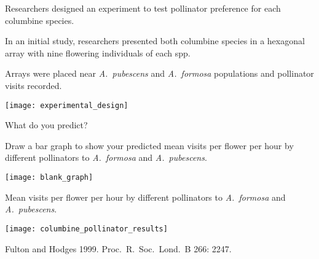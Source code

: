 \documentclass[t,hidelinks]{beamer}
\begin{document}
%
\begin{frame}[t]{Researchers designed an experiment to test pollinator preference for each columbine species.}
	
	\begin{multicols}{2}
	\hangpara In an initial study, researchers presented both columbine species in a hexagonal array with nine flowering individuals of each spp. 
	
	\hangpara Arrays were placed near \textit{A.~pubescens} and \textit{A.~formosa} populations and pollinator visits recorded.
	
	\hangpara {}

	\columnbreak
	
		\texttt{[image: experimental\_design]}
	\end{multicols}

\end{frame}
%
\begin{frame}[t]{What do you predict?}
	
	\vspace*{-\baselineskip}
	
	\hangpara Draw a bar graph to show your predicted mean visits per flower per hour by different pollinators to \textit{A.~formosa} and \textit{A.~pubescens}.
	
	\bigskip
	
	{\centering
		\texttt{[image: blank\_graph]}\par
	}
	
\end{frame}
%
\begin{frame}[t]{Mean visits per flower per hour by different pollinators to \textit{A.~formosa} and \textit{A.~pubescens}.}

	{\centering
	\texttt{[image: columbine\_pollinator\_results]}\par
	}

	\vfilll
	
	\tiny Fulton and Hodges 1999. Proc.~R.~Soc.~Lond.~B 266: 2247.
\end{frame}
%
\end{document}
